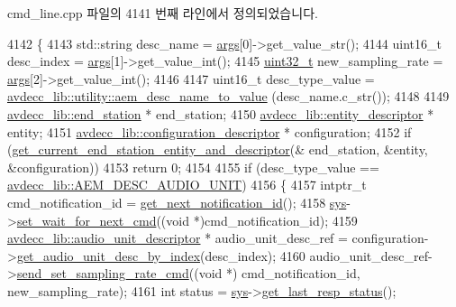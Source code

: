 cmd\+\_\+line.\+cpp 파일의 4141 번째 라인에서 정의되었습니다.


\begin{DoxyCode}
4142 \{
4143     std::string desc\_name = \hyperlink{namespaceastime__fitline_a8187411843a6284ffb964ef3fb9fcab3}{args}[0]->get\_value\_str();
4144     uint16\_t desc\_index = \hyperlink{namespaceastime__fitline_a8187411843a6284ffb964ef3fb9fcab3}{args}[1]->get\_value\_int();
4145     \hyperlink{parse_8c_a6eb1e68cc391dd753bc8ce896dbb8315}{uint32\_t} new\_sampling\_rate = \hyperlink{namespaceastime__fitline_a8187411843a6284ffb964ef3fb9fcab3}{args}[2]->get\_value\_int();
4146 
4147     uint16\_t desc\_type\_value = \hyperlink{namespaceavdecc__lib_1_1utility_a9f6076e32fa227555a95b6e95ea1e29b}{avdecc\_lib::utility::aem\_desc\_name\_to\_value}
      (desc\_name.c\_str());
4148 
4149     \hyperlink{classavdecc__lib_1_1end__station}{avdecc\_lib::end\_station} * end\_station;
4150     \hyperlink{classavdecc__lib_1_1entity__descriptor}{avdecc\_lib::entity\_descriptor} * entity;
4151     \hyperlink{classavdecc__lib_1_1configuration__descriptor}{avdecc\_lib::configuration\_descriptor} * configuration;
4152     \textcolor{keywordflow}{if} (\hyperlink{classcmd__line_ac2d4611fba7db03d436a2e3c1e64828e}{get\_current\_end\_station\_entity\_and\_descriptor}(&
      end\_station, &entity, &configuration))
4153         \textcolor{keywordflow}{return} 0;
4154 
4155     \textcolor{keywordflow}{if} (desc\_type\_value == \hyperlink{namespaceavdecc__lib_ac7b7d227e46bc72b63ee9e9aae15902fa141a799bfb339b5ff7543722da1119e2}{avdecc\_lib::AEM\_DESC\_AUDIO\_UNIT})
4156     \{
4157         intptr\_t cmd\_notification\_id = \hyperlink{classcmd__line_a57486218387d1aa9d262eb7c176154ad}{get\_next\_notification\_id}();
4158         \hyperlink{classcmd__line_a485db4800e331cb4052c447fdf5d154e}{sys}->\hyperlink{classavdecc__lib_1_1system_a26b769584f10225077da47583edda33e}{set\_wait\_for\_next\_cmd}((\textcolor{keywordtype}{void} *)cmd\_notification\_id);
4159         \hyperlink{classavdecc__lib_1_1audio__unit__descriptor}{avdecc\_lib::audio\_unit\_descriptor} * audio\_unit\_desc\_ref = 
      configuration->\hyperlink{classavdecc__lib_1_1configuration__descriptor_aa723a66eba00ad8c8f5361951f5af6e7}{get\_audio\_unit\_desc\_by\_index}(desc\_index);
4160         audio\_unit\_desc\_ref->\hyperlink{classavdecc__lib_1_1audio__unit__descriptor_aa00e262880c081a0aef022537b7ae6f4}{send\_set\_sampling\_rate\_cmd}((\textcolor{keywordtype}{void} *)
      cmd\_notification\_id, new\_sampling\_rate);
4161         \textcolor{keywordtype}{int} status = \hyperlink{classcmd__line_a485db4800e331cb4052c447fdf5d154e}{sys}->\hyperlink{classavdecc__lib_1_1system_aa63e8d1a4e51f695cdcccc9340922407}{get\_last\_resp\_status}();

\end{DoxyCode}
